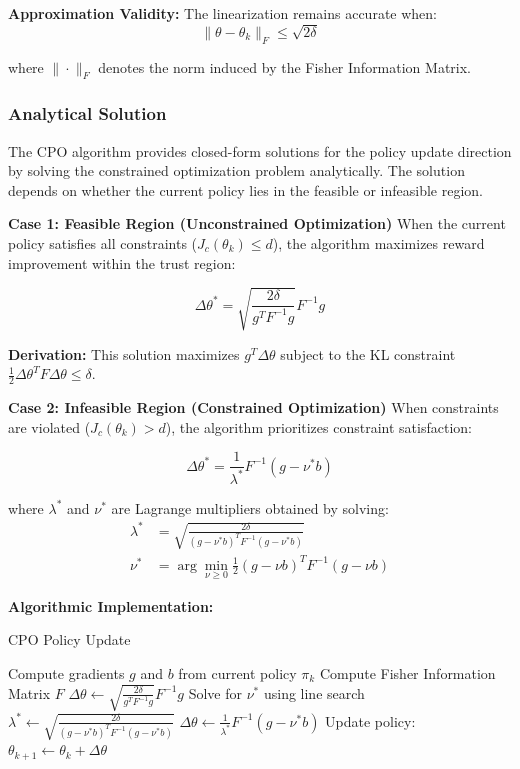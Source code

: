 \documentclass[12pt]{article}
\begin{document}
{{{{\textbf{Approximation Validity:} The linearization remains accurate when:
\begin{equation}
\|\theta - \theta_k\|_F \leq \sqrt{2\delta}
\end{equation}

where $\|\cdot\|_F$ denotes the norm induced by the Fisher Information Matrix.

\subsubsection{Analytical Solution}

The CPO algorithm provides closed-form solutions for the policy update direction by solving the constrained optimization problem analytically. The solution depends on whether the current policy lies in the feasible or infeasible region.

\textbf{Case 1: Feasible Region (Unconstrained Optimization)}
When the current policy satisfies all constraints ($J_c(\theta_k) \leq d$), the algorithm maximizes reward improvement within the trust region:

\begin{equation}
\Delta\theta^* = \sqrt{\frac{2\delta}{g^T F^{-1} g}} F^{-1} g
\end{equation}

\textbf{Derivation:} This solution maximizes $g^T \Delta\theta$ subject to the KL constraint $\frac{1}{2}\Delta\theta^T F \Delta\theta \leq \delta$.

\textbf{Case 2: Infeasible Region (Constrained Optimization)}
When constraints are violated ($J_c(\theta_k) > d$), the algorithm prioritizes constraint satisfaction:

\begin{equation}
\Delta\theta^* = \frac{1}{\lambda^*}F^{-1}(g - \nu^* b)
\end{equation}

where $\lambda^*$ and $\nu^*$ are Lagrange multipliers obtained by solving:
\begin{align}
\lambda^* &= \sqrt{\frac{2\delta}{(g - \nu^* b)^T F^{-1} (g - \nu^* b)}} \\
\nu^* &= \arg\min_{\nu \geq 0} \frac{1}{2}(g - \nu b)^T F^{-1} (g - \nu b)
\end{align}

\textbf{Algorithmic Implementation:}
\begin{algorithm}[H]
\caption{CPO Policy Update}
\begin{algorithmic}[1]
\STATE Compute gradients $g$ and $b$ from current policy $\pi_k$
\STATE Compute Fisher Information Matrix $F$
    \STATE $\Delta\theta \leftarrow \sqrt{\frac{2\delta}{g^T F^{-1} g}} F^{-1} g$
\ELSE
    \STATE Solve for $\nu^*$ using line search
    \STATE $\lambda^* \leftarrow \sqrt{\frac{2\delta}{(g - \nu^* b)^T F^{-1} (g - \nu^* b)}}$
    \STATE $\Delta\theta \leftarrow \frac{1}{\lambda^*}F^{-1}(g - \nu^* b)$
\ENDIF
\STATE Update policy: $\theta_{k+1} \leftarrow \theta_k + \Delta\theta$
\end{algorithmic}
\end{algorithm}

}}}}
\end{document}
